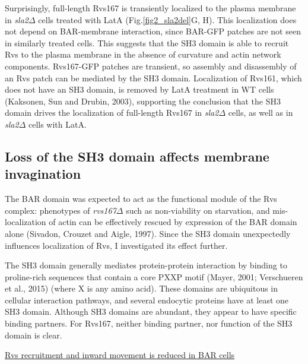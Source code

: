 	\vspace{5mm}
Surprisingly, full-length Rvs167 is transiently localized to the plasma membrane in \textit{sla2$\Delta$} cells treated with LatA (Fig.\ref{fig2_sla2del}G, H). This localization does not depend on BAR-membrane interaction, since BAR-GFP patches are not seen in similarly treated cells. This suggests that the SH3 domain is able to recruit Rvs to the plasma membrane in the absence of curvature and actin network components. Rvs167-GFP patches are transient, so assembly and disassembly of an Rvs patch can be mediated by the SH3 domain. Localization of Rvs161, which does not have an SH3 domain, is removed by LatA treatment in WT cells (Kaksonen, Sun and Drubin, 2003), supporting the conclusion that the SH3 domain drives the localization of full-length Rvs167 in \textit{sla2$\Delta$}  cells, as well as in \textit{sla2$\Delta$} cells with LatA. 


	\subsection{Loss of the SH3 domain affects membrane invagination}
	\label{delsh3_movement}
The BAR domain was expected to act as the functional module of the Rvs complex: phenotypes of \textit{rvs167$\Delta$}  such as non-viability on starvation, and mis-localization of actin can be effectively rescued by expression of the BAR domain alone (Sivadon, Crouzet and Aigle, 1997). Since the SH3 domain unexpectedly influences localization of Rvs, I investigated its effect further.

	\vspace{5mm}
The SH3 domain generally mediates protein-protein interaction by binding to proline-rich sequences that contain a core PXXP motif (Mayer, 2001; Verschueren et al., 2015) (where X is any amino acid). These domains are ubiquitous in cellular interaction pathways, and several endocytic proteins have at least one SH3 domain. Although SH3 domains are abundant, they appear to have specific binding partners. For Rvs167, neither binding partner, nor function of the SH3 domain is clear. 

	\vspace{5mm}
\underline{Rvs recruitment and inward movement is reduced in BAR cells}

